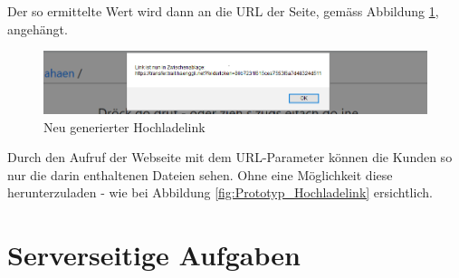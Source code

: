 Der so ermittelte Wert wird dann an die URL der Seite, gemäss Abbildung \ref{fig:Hochladelink_prototyp}, angehängt.
\begin{figure}[!h]
    \centering
    \includegraphics[width=1\linewidth]{content/images/prototyp_uploadtoken.png}
    \caption{Neu generierter Hochladelink}
    \label{fig:Hochladelink_prototyp}
\end{figure}

Durch den Aufruf der Webseite mit dem URL-Parameter können die Kunden so nur die darin enthaltenen Dateien sehen. 
Ohne eine Möglichkeit diese herunterzuladen - wie bei Abbildung \ref{fig:Prototyp_Hochladelink} ersichtlich.




\section{Serverseitige Aufgaben}
